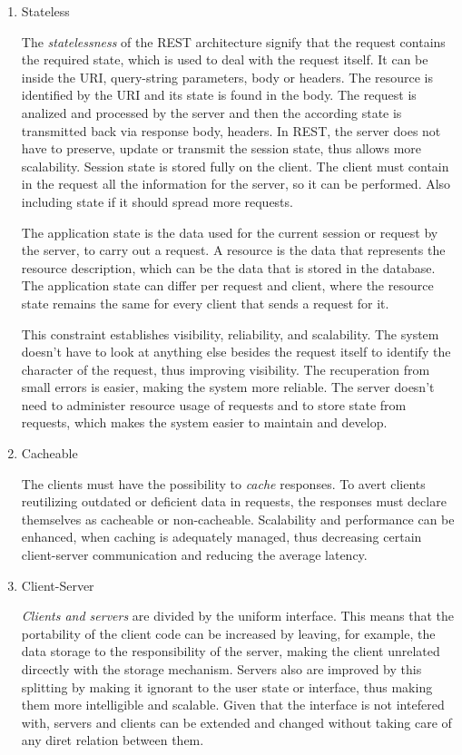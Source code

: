 \begin{enumerate}
  \item Stateless

    The \textit{statelessness} of the REST architecture signify that the request contains the required state, which is used to deal with the request itself.
    It can be inside the URI, query-string parameters, body or headers. The resource is identified by the URI and its state is found in the body. The request is analized and processed by the server and then the according state is transmitted back via response body, headers.
    In REST, the server does not have to preserve, update or transmit the session state, thus allows more scalability. Session state is stored fully on the client. The client must contain in the request all the information for the server, so it can be performed. Also including state if it should spread more requests.

    The application state is the data used for the current session or request by the server, to carry out a request. A resource is the data that represents the resource description, which can be the data that is stored in the database. The application state can differ per request and client, where the resource state remains the same for every client that sends a request for it.

    This constraint establishes visibility, reliability, and scalability. The system doesn't have to look at anything else besides the request itself to identify the character of the request, thus improving visibility. The recuperation from small errors is easier, making the system more reliable. The server doesn't need to administer resource usage of requests and to store state from requests, which makes the system easier to maintain and develop.

  \item Cacheable

    The clients must have the possibility to \textit{cache} responses. To avert clients reutilizing outdated or deficient data in requests, the responses must declare themselves as cacheable or non-cacheable. Scalability and performance can be enhanced, when caching is adequately managed, thus decreasing certain client-server communication and reducing the average latency. 

  \item Client-Server

    \textit{Clients and servers} are divided by the uniform interface. This means that the portability of the client code can be increased by leaving, for example, the data storage to the responsibility of the server, making the client unrelated dircectly with the storage mechanism. Servers also are improved by this splitting by making it ignorant to the user state or interface, thus making them more intelligible and scalable. Given that the interface is not intefered with, servers and clients can be extended and changed without taking care of any diret relation between them.


\end{enumerate}
